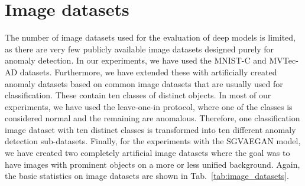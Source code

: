 \section{Image datasets} \label{sec:image_datasets}
The number of image datasets used for the evaluation of deep models is limited, as there are very few publicly available image datasets designed purely for anomaly detection. In our experiments, we have used the MNIST-C and MVTec-AD datasets. Furthermore, we have extended these with artificially created anomaly datasets based on common image datasets that are usually used for classification. These contain ten classes of distinct objects. In most of our experiments, we have used the leave-one-in protocol, where one of the classes is considered normal and the remaining are anomalous. Therefore, one classification image dataset with ten distinct classes is transformed into ten different anomaly detection sub-datasets. Finally, for the experiments with the SGVAEGAN model, we have created two completely artificial image datasets where the goal was to have images with prominent objects on a more or less unified background. Again, the basic statistics on image datasets are shown in Tab.~\ref{tab:image_datasets}.

